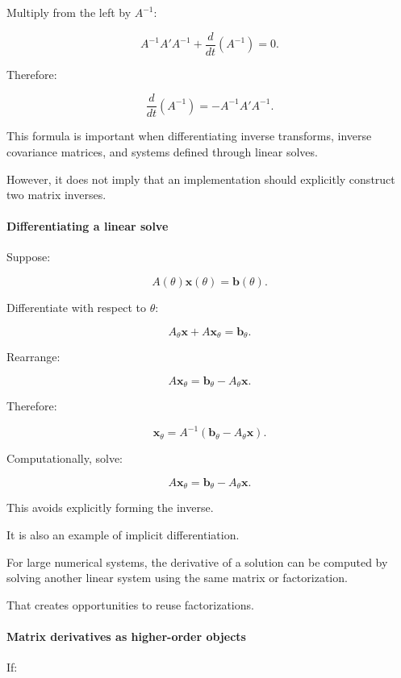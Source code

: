 Multiply from the left by \(A^{-1}\):

\[
A^{-1}A'A^{-1} + \frac d{dt}(A^{-1}) =0.
\]

Therefore:

\[
\boxed{ \frac d{dt}(A^{-1}) = -A^{-1}A'A^{-1} }.
\]

This formula is important when differentiating inverse transforms, inverse covariance matrices, and systems defined through linear solves.

However, it does not imply that an implementation should explicitly construct two matrix inverses.

\paragraph{Differentiating a linear solve}\label{02-foundations-ii-ch027-differentiating-a-linear-solve}

Suppose:

\[
A(\theta)\mathbf x(\theta)=\mathbf b(\theta).
\]

Differentiate with respect to \(\theta\):

\[
A_\theta\mathbf x+A\mathbf x_\theta = \mathbf b_\theta.
\]

Rearrange:

\[
A\mathbf x_\theta= \mathbf b_\theta-A_\theta\mathbf x.
\]

Therefore:

\[
\boxed{ \mathbf x_\theta = A^{-1}(\mathbf b_\theta-A_\theta\mathbf x) }.
\]

Computationally, solve:

\[
\boxed{ A\mathbf x_\theta = \mathbf b_\theta-A_\theta\mathbf x }.
\]

This avoids explicitly forming the inverse.

It is also an example of implicit differentiation.

For large numerical systems, the derivative of a solution can be computed by solving another linear system using the same matrix or factorization.

That creates opportunities to reuse factorizations.

\paragraph{Matrix derivatives as higher-order objects}\label{02-foundations-ii-ch027-matrix-derivatives-as-higher-order-objects}

If:

